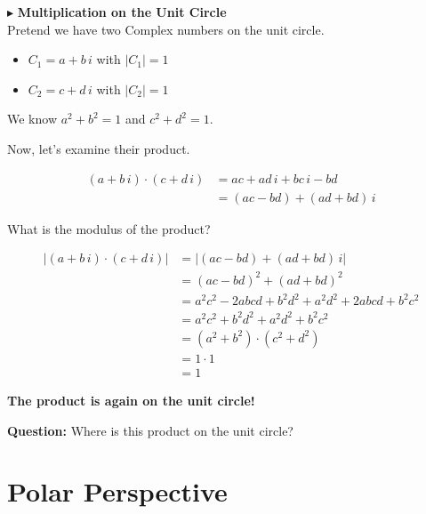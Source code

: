 \documentclass{ximera}
\begin{document}
$\blacktriangleright$ \textbf{\textcolor{blue!75!black}{Multiplication on the Unit Circle}}  \\


Pretend we have two Complex numbers on the unit circle.

\begin{itemize}
\item $C_1 = a + b \, i$ with $|C_1| = 1$
\item $C_2 = c + d \, i$ with $|C_2| = 1$
\end{itemize}



We know $a^2 + b^2 = 1$  and $c^2 + d^2 = 1$.



Now, let's examine their product.






\begin{align*}
(a + b \, i) \cdot (c + d \, i)      & = ac + ad \, i + bc \, i - bd   \\
                & = (ac - bd) + (ad + bd) \, i
\end{align*}



What is the modulus of the product?





\begin{align*}
|(a + b \, i) \cdot (c + d \, i)|      & = | (ac - bd) + (ad + bd) \, i | \\
                & = (ac - bd)^2 + (ad + bd)^2   \\
                & = a^2c^2 - 2abcd + b^2d^2 + a^2d^2 + 2abcd + b^2c^2  \\
                & = a^2c^2 + b^2d^2 + a^2d^2 + b^2c^2  \\
                & = (a^2 + b^2) \cdot (c^2 + d^2)   \\
                & = 1 \cdot 1  \\
                & = 1
\end{align*}



\textbf{\textcolor{purple!85!blue}{The product is again on the unit circle!}}





\textbf{Question:} Where is this product on the unit circle?




\section{Polar Perspective}
\end{document}
